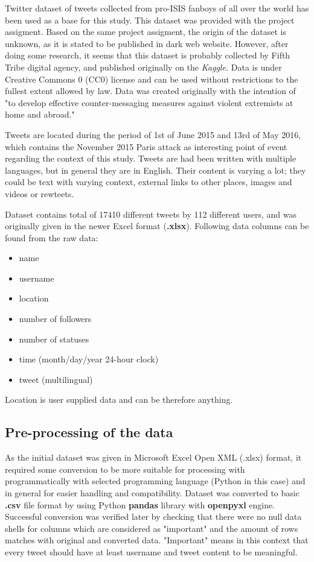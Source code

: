 \documentclass[conference]{IEEEtran}
\begin{document}
Twitter dataset of tweets collected from pro-ISIS fanboys of all over the world has been used as a base for this study.
This dataset was provided with the project assigment.
Based on the same project assigment, the origin of the dataset is unknown, as it is stated to be published in dark web website.
However, after doing some research, it seems that this dataset is probably collected by Fifth Tribe digital agency, and published originally on the \textit{Kaggle.}\cite{dataKaggleOrigin}
Data is under Creative Commons 0 (CC0) license and can be used without restrictions to the fullest extent allowed by law.
Data was created originally with the intention of "to develop effective counter-messaging measures against violent extremists at home and abroad."\cite{dataKaggleOrigin}

Tweets are located during the period of 1st of June 2015 and 13rd of May 2016, which contains the November 2015 Paris attack as interesting
point of event regarding the context of this study.
Tweets are had been written with multiple languages, but in general they are in English.
Their content is varying a lot; they could be text with varying context, external links to other places, images and videos or rewteets.

Dataset contains total of 17410 different tweets by 112 different users, and was originally given in the newer Excel format (\textbf{.xlsx}).
Following data columns can be found from the raw data:

\begin{itemize}
    \item name
    \item username
    \item location
    \item number of followers
    \item number of statuses
    \item time (month/day/year 24-hour clock)
    \item tweet (multilingual)
\end{itemize}

Location is user supplied data and can be therefore anything.

\subsection{Pre-processing of the data}\label{subsec:pre-processing-of-the-data}

As the initial dataset was given in Microsoft Excel Open XML (.xlsx) format, it required some conversion to be more suitable for processing with
programmatically with selected programming language (Python in this case) and in general for easier handling and compatibility.
Dataset was converted to basic \textbf{.csv} file format by using Python \textbf{pandas}\cite{mckinney2010data} library with \textbf{openpyxl}\cite{openpyxl} engine.
Successful conversion was verified later by checking that there were no null data shells for columns which are considered as "important" and the amount of rows matches with original and converted data.
"Important" means in this context that every tweet should have at least username and tweet content to be meaningful.
\end{document}
